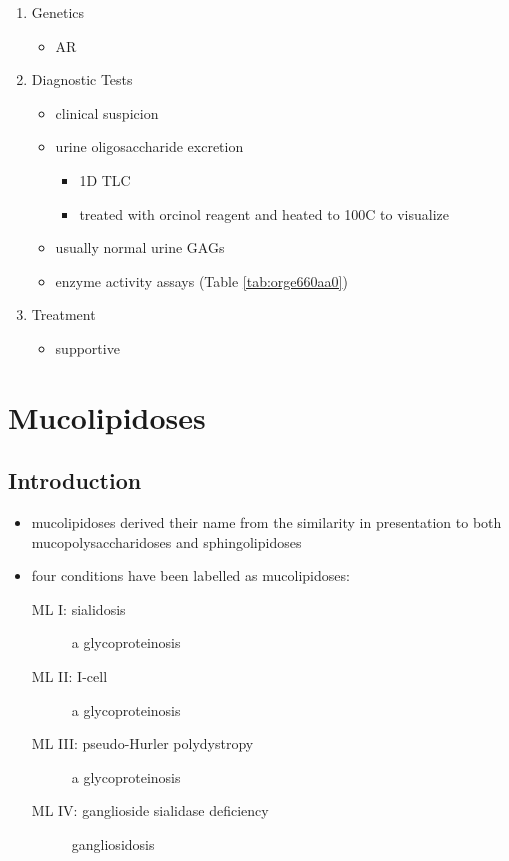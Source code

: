 \documentclass{scrartcl}
\begin{document}
\begin{enumerate}
\item Genetics
\label{sec:orgd4d1b64}
\begin{itemize}
\item AR
\end{itemize}
\item Diagnostic Tests
\label{sec:orgdc4d893}
\begin{itemize}
\item clinical suspicion
\item urine oligosaccharide excretion
\begin{itemize}
\item 1D TLC
\item treated with orcinol reagent and heated to 100C to visualize
\end{itemize}
\item usually normal urine GAGs
\item enzyme activity assays (Table \ref{tab:orge660aa0})
\end{itemize}

\item Treatment
\label{sec:org658df37}
\begin{itemize}
\item supportive
\end{itemize}
\end{enumerate}
\section{Mucolipidoses}
\label{sec:orgfeae879}
\subsection{Introduction}
\label{sec:org3755da1}
\begin{itemize}
\item mucolipidoses derived their name from the similarity in
presentation to both mucopolysaccharidoses and sphingolipidoses
\item four conditions have been labelled as mucolipidoses:
\begin{description}
\item[{ML I: sialidosis}] a glycoproteinosis
\item[{ML II: I-cell}] a glycoproteinosis
\item[{ML III: pseudo-Hurler polydystropy}] a glycoproteinosis
\item[{ML IV: ganglioside sialidase deficiency}] gangliosidosis
\end{description}
\end{itemize}
\end{document}
